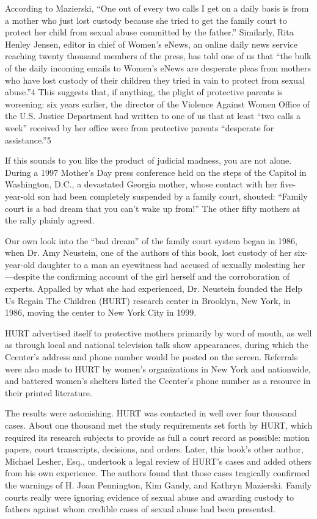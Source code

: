 According to Mazierski, “One out of every two calls I get on a daily basis is from a mother who just lost custody because she tried to get the family court to protect her child from sexual abuse committed by the father.” Similarly, Rita Henley Jensen, editor in chief of Women’s eNews, an online daily news service reaching twenty thousand members of the press, has told one of us that “the bulk of the daily incoming emails to Women’s eNews are desperate pleas from mothers who have lost custody of their children they tried in vain to protect from sexual abuse.”4 This suggests that, if anything, the plight of protective parents is worsening: six years earlier, the director of the Violence Against Women Office of the U.S. Justice Department had written to one of us that at least “two calls a week” received by her office were from protective parents “desperate for assistance.”5
 \pfl{}

If this sounds to you like the product of judicial madness, you are not alone. During a 1997 Mother’s Day press conference held on the steps of the Capitol in Washington, D.C., a devastated Georgia mother, whose contact with her five-year-old son had been completely suspended by a family court, shouted: “Family court is a bad dream that you can’t wake up from!” The other fifty mothers at the rally plainly agreed. \pfl{}


Our own look into the “bad dream” of the family court system began in 1986, when Dr. Amy Neustein, one of the authors of this book, lost custody of her six-year-old daughter to a man an eyewitness had accused of sexually molesting her—despite the confirming account of the girl herself and the corroboration of experts. Appalled by what she had experienced, Dr. Neustein founded the Help Us Regain The Children (HURT) research center in Brooklyn, New York, in 1986, moving the center to New York City in 1999. \pfl{}


HURT advertised itself to protective mothers primarily by word of mouth, as well as through local and national television talk show appearances, during which the Ccenter’s address and phone number would be posted on the screen. Referrals were also made to HURT by women’s organizations in New York and nationwide, and battered women’s shelters listed the Ccenter’s phone number as a resource in their printed literature. \pfl{}


The results were astonishing. HURT was contacted in well over four thousand cases. About one thousand met the study requirements set forth by HURT, which required its research subjects to provide as full a court record as possible: motion papers, court transcripts, decisions, and orders. Later, this book’s other author, Michael Lesher, Esq., undertook a legal review of HURT’s cases and added others from his own experience. The authors found that those cases tragically confirmed the warnings of H. Joan Pennington, Kim Gandy, and Kathryn Mazierski. Family courts really were ignoring evidence of sexual abuse and awarding custody to fathers against whom credible cases of sexual abuse had been presented. \pfl{}


